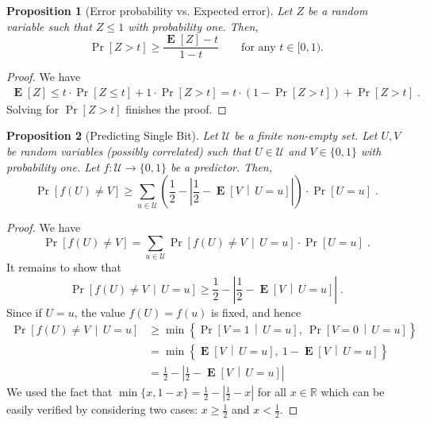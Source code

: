 \documentclass[11pt]{article}
\newtheorem{proposition}{Proposition}
\newcommand{\R}{\mathbb{R}}
\newcommand{\U}{\mathcal{U}}
\DeclareMathOperator{\Exp}{\mathbf{E}}
\begin{document}
\begin{proposition}[Error probability vs. Expected error]
\label{proposition:error-probability-vs-expected-error}
Let $Z$ be a random variable such that $Z \le 1$ with probability one.
Then,
$$
\Pr[Z > t] \ge \frac{\Exp[Z] - t}{1 - t} \qquad \text{for any $t \in [0, 1)$.}
$$
\end{proposition}

\begin{proof}
We have
\begin{align*}
\Exp[Z]
\le t \cdot \Pr[Z \le t] + 1 \cdot \Pr[Z > t] 
= t \cdot (1 - \Pr[Z > t]) + \Pr[Z > t] \; .
\end{align*}
Solving for $\Pr[Z > t]$ finishes the proof.
\end{proof}

\begin{proposition}[Predicting Single Bit]
\label{proposition:single-bit}
Let $\U$ be a finite non-empty set. Let $U,V$ be random variables (possibly
correlated) such that $U \in \U$ and $V \in \{0,1\}$ with probability one. Let
$f:\U \to \{0,1\}$ be a predictor. Then,
$$
\Pr\left[ f(U) \neq V \right]
\ge \sum_{u \in \U} \left( \frac{1}{2} - \left| \frac{1}{2} -  \Exp \left[V \, \middle| \, U = u\right] \right| \right) \cdot \Pr[U = u] \; .
$$
\end{proposition}

\begin{proof}
We have
$$
\Pr \left[ f(U) \neq V \right] = \sum_{u \in \U} \Pr \left[ f(U) \neq V \, \middle| \, U = u \right] \cdot \Pr[U = u] \; .
$$
It remains to show that
$$
\Pr\left[ f(U) \neq V \, \middle| \, U = u \right]
\ge
\frac{1}{2} - \left| \frac{1}{2} -  \Exp \left[V \, \middle| \, U = u \right] \right| \; .
$$
Since if  $U=u$, the value $f(U) = f(u)$ is fixed, and hence
\begin{align*}
\Pr\left[ f(U) \neq V \, \middle| \, U = u \right] 
& \ge \min\left\{ \Pr \left[ V = 1 \, \middle| \, U = u \right], \ \Pr \left[ V = 0 \, \middle| \, U = u \right] \right\} \\
& = \min\left\{ \Exp \left[ V  \, \middle| \, U = u \right], \ 1 - \Exp \left[ V \, \middle| \, U = u \right] \right\} \\
& = \frac{1}{2} - \left| \frac{1}{2} -  \Exp \left[ V  \, \middle| \, U = u \right] \right|
\end{align*}
We used the fact that $\min\{x, 1 - x\} = \frac{1}{2} - \left| \frac{1}{2} - x \right|$ for all $x \in \R$
which can be easily verified by considering two cases: $x \ge \frac{1}{2}$ and $x < \frac{1}{2}$.
\end{proof}
\end{document}
